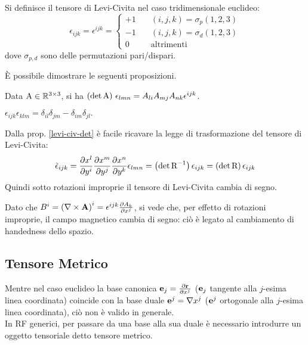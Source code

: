 \begin{definition}
	Si definisce il tensore di Levi-Civita nel caso tridimensionale euclideo:
	\begin{equation}
		\epsilon_{ijk} = \epsilon^{ijk} = 
		\begin{cases}
			+1 &\quad (i,j,k) = \sigma_p(1,2,3) \\
			-1 &\quad (i,j,k) = \sigma_d(1,2,3) \\
			0  &\quad \text{altrimenti}
		\end{cases}
		\label{eq:10}
	\end{equation}
	dove $ \sigma_{p,d} $ sono delle permutazioni pari/dispari.
\end{definition}

È possibile dimostrare le seguenti proposizioni.

\begin{proposition}\label{levi-civ-det}
	Data $ \mathbf{\text{A}} \in \mathbb{R}^{3\times 3} $, si ha $ \left(\det\mathbf{\text{A}}\right)\, \epsilon_{lmn} = A_{li} A_{mj} A_{nk} \epsilon^{ijk} $.
\end{proposition}

\begin{proposition}\label{epsilon-delta}
	$ \epsilon_{ijk}\epsilon_{klm} = \delta_{il}\delta_{jm} - \delta_{im}\delta_{jl}.$
\end{proposition}

Dalla prop. \ref{levi-civ-det} è facile ricavare la legge di trasformazione del tensore di Levi-Civita:
\begin{equation}
	\tilde{\epsilon}_{ijk} = \frac{\partial x^l}{\partial y^i} \frac{\partial x^m}{\partial y^j} \frac{\partial x^n}{\partial y^k} \epsilon_{lmn} = \left(\det\mathbf{\text{R}}^{-1}\right) \epsilon_{ijk} = \left(\det\mathbf{\text{R}}\right) \epsilon_{ijk}
	\label{eq:11}
\end{equation}
Quindi sotto rotazioni improprie il tensore di Levi-Civita cambia di segno.

\begin{example}
	Dato che $ B^i = \left(\nabla\times\mathbf{A}\right)^i = \epsilon^{ijk}\frac{\partial A_k}{\partial x^j}$, si vede che, per effetto di rotazioni improprie, il campo magnetico cambia di segno: ciò è legato al cambiamento di handedness dello spazio.
\end{example}


\subsection{Tensore Metrico}


Mentre nel caso euclideo la base canonica $ \mathbf{e}_j = \frac{\partial \mathbf{r}}{\partial x^j} $ ($ \mathbf{e}_j $ tangente alla $ j $-esima linea coordinata) coincide con la base duale $ \mathbf{e}^j = \nabla x^j $ ($ \mathbf{e}^j $ ortogonale alla $ j $-esima linea coordinata), ciò non è valido in generale.\\
In RF generici, per passare da una base alla sua duale è necessario introdurre un oggetto tensoriale detto tensore metrico.

